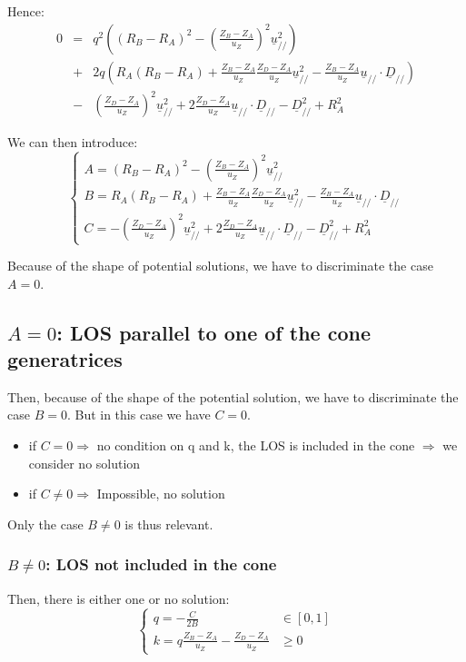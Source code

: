 \documentclass[a4paper,11pt,twoside,titlepage,openright]{book}
\numberwithin{equation}{section}
\newcommand{\ud}[1]{\underline{#1}}
\begin{document}
Hence:
$$
\begin{array}{lll}
0 &=& q^2\left( (R_B-R_A)^2 - \left(\frac{Z_B-Z_A}{u_Z}\right)^2\ud{u}_{//}^2 \right)\\
& + & 2q\left( R_A(R_B-R_A) + \frac{Z_B-Z_A}{u_Z}\frac{Z_D-Z_A}{u_Z}\ud{u}_{//}^2 - \frac{Z_B-Z_A}{u_Z}\ud{u}_{//}\cdot\ud{D}_{//}  \right)\\
& - & \left(\frac{Z_D-Z_A}{u_Z}\right)^2\ud{u}_{//}^2 + 2\frac{Z_D-Z_A}{u_Z}\ud{u}_{//}\cdot\ud{D}_{//} - \ud{D}_{//}^2 + R_A^2 
\end{array}
$$

We can then introduce:
$$
\left\{
\begin{array}{ll}
A = (R_B-R_A)^2 - \left(\frac{Z_B-Z_A}{u_Z}\right)^2\ud{u}_{//}^2\\
B = R_A(R_B-R_A) + \frac{Z_B-Z_A}{u_Z}\frac{Z_D-Z_A}{u_Z}\ud{u}_{//}^2 - \frac{Z_B-Z_A}{u_Z}\ud{u}_{//}\cdot\ud{D}_{//}\\
C = -\left(\frac{Z_D-Z_A}{u_Z}\right)^2\ud{u}_{//}^2 + 2\frac{Z_D-Z_A}{u_Z}\ud{u}_{//}\cdot\ud{D}_{//} - \ud{D}_{//}^2 + R_A^2
\end{array}
\right.
$$

Because of the shape of potential solutions, we have to discriminate the case $A=0$.

\subsection{$A=0$: LOS parallel to one of the cone generatrices}

Then, because of the shape of the potential solution, we have to discriminate the case $B=0$.
But in this case we have $C=0$. 
\begin{itemize}
\item if $C=0 \Rightarrow$ no condition on q and k, the LOS is included in the cone $\Rightarrow$ we consider no solution
\item if $C\neq 0 \Rightarrow$ Impossible, no solution
\end{itemize}

Only the case $B\neq 0$ is thus relevant.

\subsubsection{$B\neq0$: LOS not included in the cone}

Then, there is either one or no solution:
$$
\left\{
\begin{array}{ll}
q = -\frac{C}{2B} & \in [0,1]\\
k = q\frac{Z_B-Z_A}{u_Z} - \frac{Z_D-Z_A}{u_Z} & \geq 0
\end{array}
\right.
$$
\end{document}
